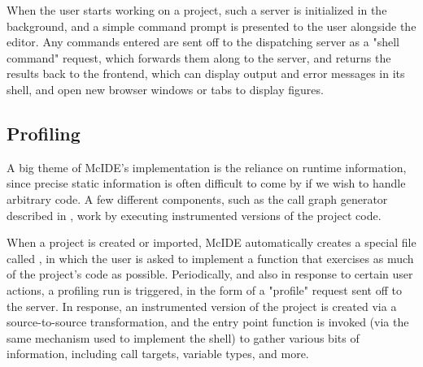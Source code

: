 When the user starts working on a project, such a \matlab server is initialized
in the background, and a simple command prompt is presented to the user
alongside the editor. Any commands entered are sent off to the dispatching
server as a "shell command" request, which forwards them along to the \matlab
server, and returns the results back to the frontend, which can display output
and error messages in its shell, and open new browser windows or tabs to
display figures.

\subsection{Profiling}

A big theme of McIDE's implementation is the reliance on runtime information,
since precise static information is often difficult to come by if we wish to
handle arbitrary \matlab code. A few different components, such as the call
graph generator described in , work
by executing instrumented versions of the project code.

When a project is created or imported, McIDE automatically creates a special
file called , in which the user is asked to implement
a function that exercises as much of the project's code as possible.
Periodically, and also in response to certain user actions, a profiling run is
triggered, in the form of a "profile" request sent off to the server. In
response, an instrumented version of the project is created via a
source-to-source transformation, and the entry point function is invoked (via
the same mechanism used to implement the \matlab shell) to gather various bits
of information, including call targets, variable types, and more.
